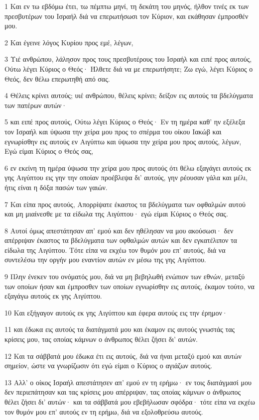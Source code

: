 \par 1 Και εν τω εβδόμω έτει, τω πέμπτω μηνί, τη δεκάτη του μηνός, ήλθον τινές εκ των πρεσβυτέρων του Ισραήλ διά να επερωτήσωσι τον Κύριον, και εκάθησαν έμπροσθέν μου.
\par 2 Και έγεινε λόγος Κυρίου προς εμέ, λέγων,
\par 3 Υιέ ανθρώπου, λάλησον προς τους πρεσβυτέρους του Ισραήλ και ειπέ προς αυτούς, Ούτω λέγει Κύριος ο Θεός· Ήλθετε διά να με επερωτήσητε; Ζω εγώ, λέγει Κύριος ο Θεός, δεν θέλω επερωτηθή από σας.
\par 4 Θέλεις κρίνει αυτούς; υιέ ανθρώπου, θέλεις κρίνει; δείξον εις αυτούς τα βδελύγματα των πατέρων αυτών·
\par 5 και ειπέ προς αυτούς, Ούτω λέγει Κύριος ο Θεός· Εν τη ημέρα καθ' ην εξέλεξα τον Ισραήλ και ύψωσα την χείρα μου προς το σπέρμα του οίκου Ιακώβ και εγνωρίσθην εις αυτούς εν Αιγύπτω και ύψωσα την χείρα μου προς αυτούς, λέγων, Εγώ είμαι Κύριος ο Θεός σας,
\par 6 εν εκείνη τη ημέρα ύψωσα την χείρα μου προς αυτούς ότι θέλω εξαγάγει αυτούς εκ γης Αιγύπτου εις γην την οποίαν προέβλεψα δι' αυτούς, γην ρέουσαν γάλα και μέλι, ήτις είναι η δόξα πασών των γαιών.
\par 7 Και είπα προς αυτούς, Απορρίψατε έκαστος τα βδελύγματα των οφθαλμών αυτού και μη μιαίνεσθε με τα είδωλα της Αιγύπτου· εγώ είμαι Κύριος ο Θεός σας.
\par 8 Αυτοί όμως απεστάτησαν απ' εμού και δεν ηθέλησαν να μου ακούσωσι· δεν απέρριψαν έκαστος τα βδελύγματα των οφθαλμών αυτών και δεν εγκατέλιπον τα είδωλα της Αιγύπτου. Τότε είπα να εκχέω τον θυμόν μου επ' αυτούς, διά να συντελέσω την οργήν μου εναντίον αυτών εν μέσω της γης Αιγύπτου.
\par 9 Πλην ένεκεν του ονόματός μου, διά να μη βεβηλωθή ενώπιον των εθνών, μεταξύ των οποίων ήσαν και έμπροσθεν των οποίων εγνωρίσθην εις αυτούς, έκαμον τούτο, να εξαγάγω αυτούς εκ γης Αιγύπτου.
\par 10 Και εξήγαγον αυτούς εκ γης Αιγύπτου και έφερα αυτούς εις την έρημον·
\par 11 και έδωκα εις αυτούς τα διατάγματά μου και έκαμον εις αυτούς γνωστάς τας κρίσεις μου, τας οποίας κάμνων ο άνθρωπος θέλει ζήσει δι' αυτών.
\par 12 Και τα σάββατά μου έδωκα έτι εις αυτούς, διά να ήναι μεταξύ εμού και αυτών σημείον, ώστε να γνωρίζωσιν ότι εγώ είμαι ο Κύριος ο αγιάζων αυτούς.
\par 13 Αλλ' ο οίκος Ισραήλ απεστάτησεν απ' εμού εν τη ερήμω· εν τοις διατάγμασί μου δεν περιεπάτησαν και τας κρίσεις μου απέρριψαν, τας οποίας κάμνων ο άνθρωπος θέλει ζήσει δι' αυτών· και τα σάββατά μου εβεβήλωσαν σφόδρα· τότε είπα να εκχέω τον θυμόν μου επ' αυτούς εν τη ερήμω, διά να εξολοθρεύσω αυτούς.
